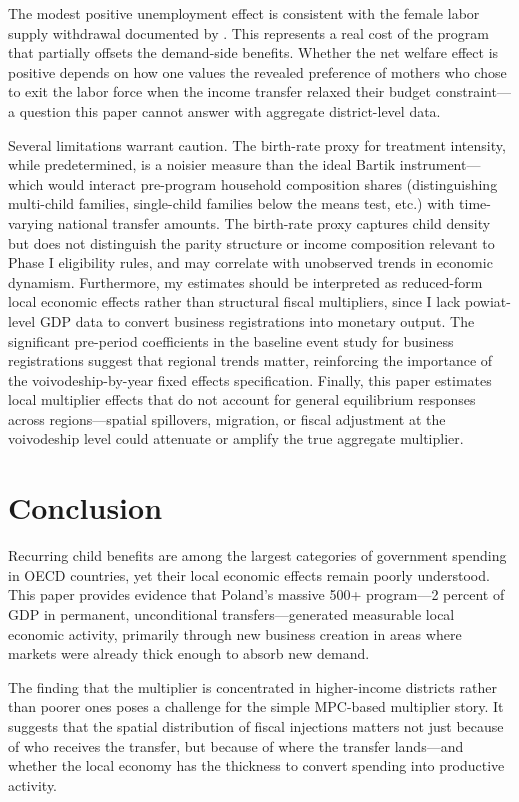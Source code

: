 \documentclass[12pt]{article}
\begin{document}
The modest positive unemployment effect is consistent with the female labor supply withdrawal documented by \citet{myck2019labour}. This represents a real cost of the program that partially offsets the demand-side benefits. Whether the net welfare effect is positive depends on how one values the revealed preference of mothers who chose to exit the labor force when the income transfer relaxed their budget constraint---a question this paper cannot answer with aggregate district-level data.

Several limitations warrant caution. The birth-rate proxy for treatment intensity, while predetermined, is a noisier measure than the ideal Bartik instrument---which would interact pre-program household composition shares (distinguishing multi-child families, single-child families below the means test, etc.) with time-varying national transfer amounts. The birth-rate proxy captures child density but does not distinguish the parity structure or income composition relevant to Phase I eligibility rules, and may correlate with unobserved trends in economic dynamism. Furthermore, my estimates should be interpreted as reduced-form local economic effects rather than structural fiscal multipliers, since I lack powiat-level GDP data to convert business registrations into monetary output. The significant pre-period coefficients in the baseline event study for business registrations suggest that regional trends matter, reinforcing the importance of the voivodeship-by-year fixed effects specification. Finally, this paper estimates local multiplier effects that do not account for general equilibrium responses across regions---spatial spillovers, migration, or fiscal adjustment at the voivodeship level could attenuate or amplify the true aggregate multiplier.


\section{Conclusion}

Recurring child benefits are among the largest categories of government spending in OECD countries, yet their local economic effects remain poorly understood. This paper provides evidence that Poland's massive 500+ program---2 percent of GDP in permanent, unconditional transfers---generated measurable local economic activity, primarily through new business creation in areas where markets were already thick enough to absorb new demand.

The finding that the multiplier is concentrated in higher-income districts rather than poorer ones poses a challenge for the simple MPC-based multiplier story. It suggests that the spatial distribution of fiscal injections matters not just because of who receives the transfer, but because of where the transfer lands---and whether the local economy has the thickness to convert spending into productive activity.
\end{document}
